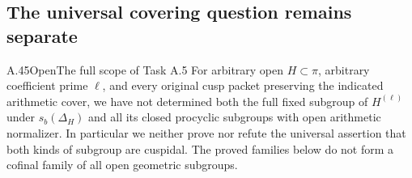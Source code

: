 \subsection{The universal covering question remains separate}

\begin{statement}{A.45}{Open}{The full scope of Task A.5}
For arbitrary open \(H\subset\pi\), arbitrary coefficient prime
\(\ell\), and every original cusp packet preserving the indicated
arithmetic cover, we have not determined both the full fixed subgroup
of \(H^{(\ell)}\) under \(s_b(\Delta_H)\) and all its closed
procyclic subgroups with open arithmetic normalizer.
In particular we neither prove nor refute the universal assertion
that both kinds of subgroup are cuspidal. The proved families below
do not form a cofinal family of all open geometric subgroups.
\end{statement}

